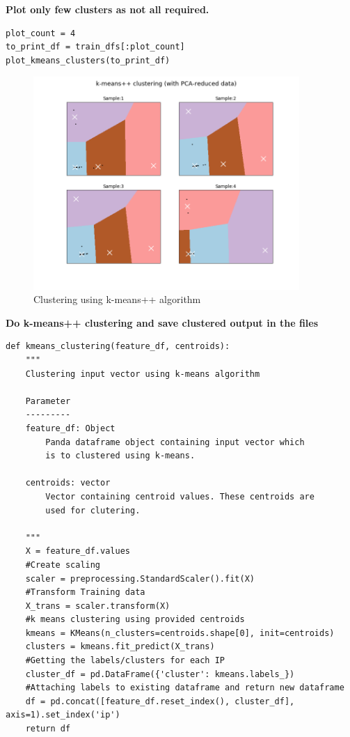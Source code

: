 \documentclass{article}
\begin{document}
\textbf{Plot only few clusters as not all required.}
\begin{verbatim}
plot_count = 4
to_print_df = train_dfs[:plot_count]
plot_kmeans_clusters(to_print_df)
\end{verbatim}

\begin{figure}[H]
\centering
\includegraphics[width=0.90\textwidth]{kemans-clustering.png}
\caption{Clustering using k-means++ algorithm} \label{fig:kmeans-clustering-in-program}
\end{figure}
\pagebreak
\textbf{\large{Do k-means++ clustering and save clustered output in the files}}
\begin{verbatim}
def kmeans_clustering(feature_df, centroids):
    """
    Clustering input vector using k-means algorithm

    Parameter
    ---------
    feature_df: Object
        Panda dataframe object containing input vector which
        is to clustered using k-means.

    centroids: vector
        Vector containing centroid values. These centroids are
        used for clutering.

    """
    X = feature_df.values
    #Create scaling
    scaler = preprocessing.StandardScaler().fit(X)
    #Transform Training data
    X_trans = scaler.transform(X)
    #k means clustering using provided centroids
    kmeans = KMeans(n_clusters=centroids.shape[0], init=centroids)
    clusters = kmeans.fit_predict(X_trans)
    #Getting the labels/clusters for each IP
    cluster_df = pd.DataFrame({'cluster': kmeans.labels_})
    #Attaching labels to existing dataframe and return new dataframe
    df = pd.concat([feature_df.reset_index(), cluster_df], axis=1).set_index('ip')
    return df
\end{verbatim}
\end{document}
